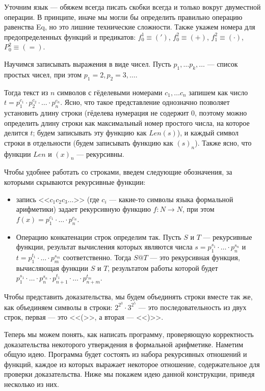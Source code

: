 Уточним язык --- обяжем всегда писать скобки всегда и только вокруг двуместной
операции. В принципе, иначе мы могли бы определить правильно операцию равенства Eq,
но это лишние технические сложности.
Также укажем номера для предопределенных функций и предикатов:
$f_0^1 \equiv (')$, $f_0^2 \equiv (+)$, $f_1^2 \equiv (\cdot)$, $P_0^2 \equiv (=)$.

Научимся записывать выражения в виде чисел. Пусть $p_1, \dots p_k, \dots$ --- список простых
чисел, при этом $p_1 = 2, p_2 = 3, \dots$. 

Тогда текст из $n$ символов с гёделевыми номерами $c_1, \dots c_n$ запишем как число
$t = p_1^{c_1} \cdot p_2^{c_2} \cdot \dots \cdot p_n^{c_n}$. Ясно, что такое представление
однозначно позволяет установить длину строки (гёделева нумерация не содержит 0, поэтому
можно определить длину строки как максимальный номер простого числа, на которое делится $t$;
будем записывать эту функцию как $Len(s)$),
и каждый символ строки в отдельности (будем записывать функцию как $(s)_n$).
Также ясно, что функции $Len$ и $(x)_n$ --- рекурсивны.

Чтобы удобнее работать со строками, введем следующие обозначения, за которыми скрываются
рекурсивные функции:

\begin{itemize}
\item запись $\texttt{<<}c_1 c_2 c_3 \dots \texttt{>>}$ (где $c_i$ --- какие-то символы языка формальной арифметики)
задает рекурсивную функцию $f: N \rightarrow N$, при этом $f(x) = p_1^{c_1} \cdot \dots \cdot p_n^{c_n}$.

\item Операцию конкатенации строк определим так. Пусть $S$ и $T$ --- рекурсивные функции,
результат вычисления которых являются числа $s = p_1^{s_1} \cdot \dots \cdot p_n^{s_n}$ и
$t = p_1^{t_1} \cdot \dots \cdot p_m^{s_m}$ соответственно. 
Тогда $S @ T$ --- это рекурсивная функция, вычисляющая функции $S$ и $T$, 
результатом работы которой будет
$p_1^{s_1} \cdot \dots \cdot p_n^{s_n} \cdot p_{n+1}^{t_1} \cdot \dots \cdot p_{n+m}^{t_m}$.

\end{itemize}

Чтобы представить доказательства, мы будем объединять строки вместе так же, как
объединяем символы в строки: $2^{2^3} \cdot 3^{2^5}$ --- это последовательность
из двух строк, первая --- это <<(>>, а вторая --- <<)>>.

Теперь мы можем понять, как написать программу, проверяющую корректность доказательства 
некоторого утверждения в формальной арифметике. Наметим общую идею. Программа будет состоять из набора
рекурсивных отношений и функций, каждое из которых выражает некоторое 
отношение, содержательное для проверки доказательства. Ниже мы покажем идею 
данной конструкции, приведя несколько из них.

